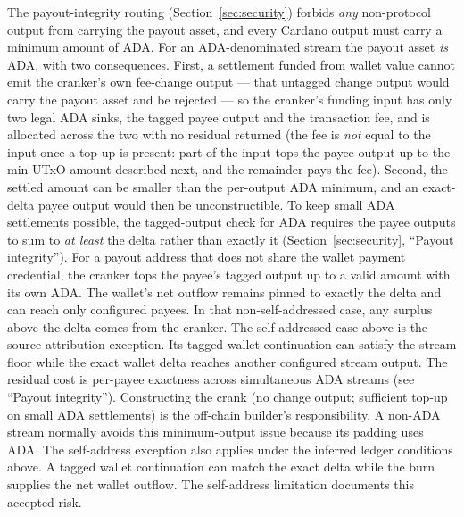 \begin{description}[leftmargin=1.4em,style=nextline]
\item[ADA settlement granularity and fee funding.] The payout-integrity routing (Section~\ref{sec:security}) forbids \emph{any} non-protocol output from carrying the payout asset, and every Cardano output must carry a minimum amount of ADA. For an ADA-denominated stream the payout asset \emph{is} ADA, with two consequences. First, a settlement funded from wallet value cannot emit the cranker's own fee-change output --- that untagged change output would carry the payout asset and be rejected --- so the cranker's funding input has only two legal ADA sinks, the tagged payee output and the transaction fee, and is allocated across the two with no residual returned (the fee is \emph{not} equal to the input once a top-up is present: part of the input tops the payee output up to the min-UTxO amount described next, and the remainder pays the fee). Second, the settled amount can be smaller than the per-output ADA minimum, and an exact-delta payee output would then be unconstructible. To keep small ADA settlements possible, the tagged-output check for ADA requires the payee outputs to sum to \emph{at least} the delta rather than exactly it (Section~\ref{sec:security}, ``Payout integrity''). For a payout address that does not share the wallet payment credential, the cranker tops the payee's tagged output up to a valid amount with its own ADA. The wallet's net outflow remains pinned to exactly the delta and can reach only configured payees. In that non-self-addressed case, any surplus above the delta comes from the cranker. The self-addressed case above is the source-attribution exception. Its tagged wallet continuation can satisfy the stream floor while the exact wallet delta reaches another configured stream output. The residual cost is per-payee exactness across simultaneous ADA streams (see ``Payout integrity''). Constructing the crank (no change output; sufficient top-up on small ADA settlements) is the off-chain builder's responsibility. A non-ADA stream normally avoids this minimum-output issue because its padding uses ADA. The self-address exception also applies under the inferred ledger conditions above. A tagged wallet continuation can match the exact delta while the burn supplies the net wallet outflow. The self-address limitation documents this accepted risk.
\end{description}
